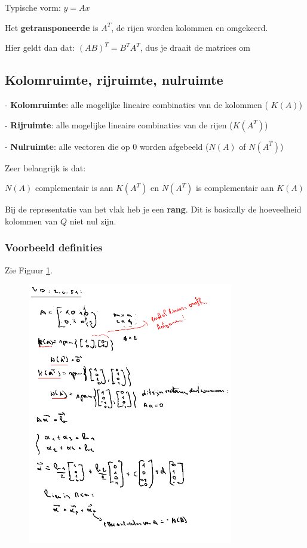 \documentclass[a4paper]{report}
\begin{document}
Typische vorm: $y=Ax$

Het \textbf{getransponeerde} is $A^T$, de rijen worden kolommen en omgekeerd.

Hier geldt dan dat: $(AB)^T = B^T A^T$, dus je draait de matrices om

\subsection{Kolomruimte, rijruimte, nulruimte}

- \textbf{Kolomruimte}: alle mogelijke lineaire combinaties van de kolommen ( $K(A)$)

- \textbf{Rijruimte}: alle mogelijke lineaire combinaties van de rijen ($K(A^T)$)

- \textbf{Nulruimte}: alle vectoren die op 0 worden afgebeeld ($N(A)$ of $N(A^T)$)

Zeer belangrijk is dat:

$N(A)$ complementair is aan $K(A^T)$ en $N(A^T)$ is complementair aan $K(A)$

Bij de representatie van het vlak heb je een \textbf{rang}. Dit is basically de hoeveelheid kolommen van $Q$ niet nul zijn.

\subsubsection{Voorbeeld definities}

Zie Figuur \ref{fig:kolom_rij_null}.

\begin{figure}[hbpt!]
	\centering
	\includegraphics[width=0.8\textwidth]{assets/kolom_rij_null.png}
	\caption{}
	\label{fig:kolom_rij_null}
\end{figure}
\end{document}
